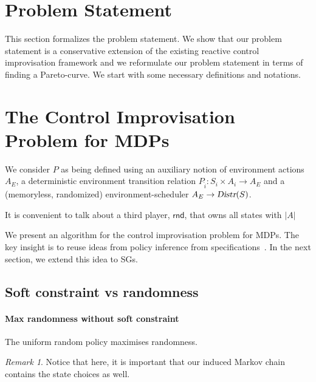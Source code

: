 \documentclass[conference]{IEEEtran}
\theoremstyle{remark}
\newtheorem{remark}{Remark}
\newcommand{\Distr}{\ensuremath{\textsl{Distr}}}
\newcommand{\Act}{A}
\begin{document}
\section{Problem Statement}
This section formalizes the problem statement. We show that our problem statement is a conservative extension of the existing reactive control improvisation framework and we reformulate our problem statement in terms of finding a Pareto-curve. We start with some necessary definitions and notations.







\section{The Control Improvisation Problem for MDPs}
\label{sec:mdps}
\color{black!50}
We consider $P$ as being defined using an auxiliary notion of environment actions $\Act_E$, a deterministic environment transition relation $P_{\hat{i}}\colon S_i \times \Act_i \rightarrow A_E$ and a (memoryless, randomized) environment-scheduler $A_E \rightarrow \Distr(S)$.



It is convenient to talk about a third player, $\mathsf{rnd}$, that owns all states with $|\Act|$


We present an algorithm for the control improvisation problem for MDPs. The key insight is to reuse ideas from policy inference from specifications~\cite{DBLP:conf/cav/Vazquez-Chanlatte20}.
In the next section, we extend this idea to SGs. 




\subsection{Soft constraint vs randomness}
\paragraph{Max randomness without soft constraint}
The uniform random policy maximises randomness.
\begin{remark}
Notice that here, it is important that our induced Markov chain contains the state choices as well.	
\end{remark}
\end{document}
